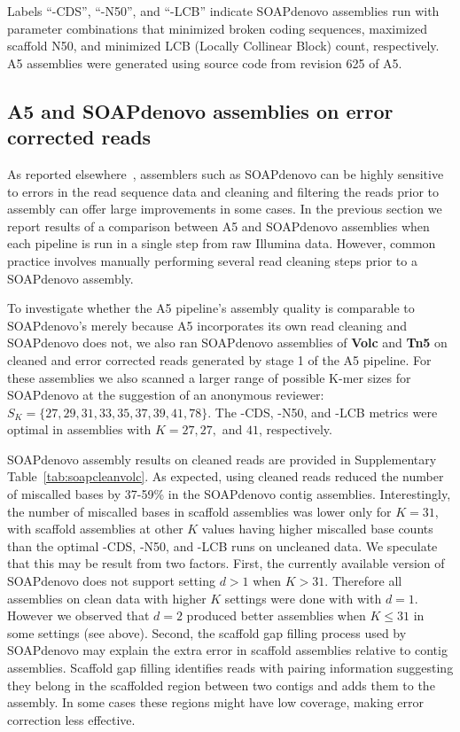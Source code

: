 \documentclass[10pt]{article}
\begin{document}
Labels ``-CDS'', ``-N50'', and ``-LCB'' indicate SOAPdenovo assemblies run with parameter combinations that minimized broken coding 
sequences, maximized scaffold N50, and minimized LCB (Locally Collinear Block) count, respectively. 
A5 assemblies were generated using source code from revision 625 of A5.

\subsection*{A5 and SOAPdenovo assemblies on error corrected reads}

As reported elsewhere~\cite{Salzberg2011}, assemblers such as SOAPdenovo can be highly sensitive to errors in the read sequence data and cleaning and filtering the reads prior to assembly can offer large improvements in some cases.
In the previous section we report results of a comparison between A5 and SOAPdenovo assemblies when each pipeline is run in a single step from raw Illumina data.
However, common practice involves manually performing several read cleaning steps prior to a SOAPdenovo assembly.

To investigate whether the A5 pipeline's assembly quality is comparable to SOAPdenovo's merely because A5 incorporates its own read cleaning and SOAPdenovo does not, we also ran SOAPdenovo assemblies of \textbf{Volc} and \textbf{Tn5} on cleaned and error corrected reads generated by stage 1 of the A5 pipeline.
For these assemblies we also scanned a larger range of possible K-mer sizes for SOAPdenovo at the suggestion of an anonymous reviewer: $S_K = \{27,29,31,33,35,37,39,41,78\}$. The -CDS, -N50, and -LCB metrics were optimal in assemblies with $K=27, 27,$ and $41$, respectively.

SOAPdenovo assembly results on cleaned reads are provided in Supplementary Table~\ref{tab:soapcleanvolc}. 
As expected, using cleaned reads reduced the number of miscalled bases by 37-59\% in the SOAPdenovo contig assemblies.
Interestingly, the number of miscalled bases in scaffold assemblies was lower only for $K=31$, with scaffold assemblies at other $K$ values having higher miscalled base counts than the optimal -CDS, -N50, and -LCB runs on uncleaned data.
We speculate that this may be result from two factors. First, the currently available version of SOAPdenovo does not support setting $d>1$ when $K>31$. Therefore all assemblies on clean data with higher $K$ settings were done with with $d=1$. However we observed that $d=2$ produced better assemblies when $K \le 31$ in some settings (see above). Second, the scaffold gap filling process used by SOAPdenovo may explain the extra error in scaffold assemblies relative to contig assemblies. Scaffold gap filling identifies reads with pairing information suggesting they belong in the scaffolded region between two contigs and adds them to the assembly. In some cases these regions might have low coverage, making error correction less effective.
\end{document}
